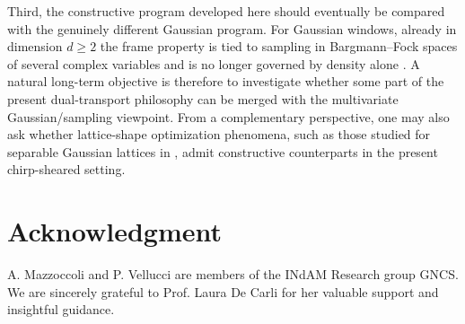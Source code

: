\documentclass[final,1p,times,authoryear]{elsarticle}
\theoremstyle{definition}
\newcommand{\1}{\mathbf{1}}
\begin{document}
Third, the constructive program developed here should eventually be compared with the genuinely different Gaussian program. For Gaussian windows, already in dimension $d\geq 2$ the frame property is tied to sampling in Bargmann--Fock spaces of several complex variables and is no longer governed by density alone \citep{Gro11}. A natural long-term objective is therefore to investigate whether some part of the present dual-transport philosophy can be merged with the multivariate Gaussian/sampling viewpoint. From a complementary perspective, one may also ask whether lattice-shape optimization phenomena, such as those studied for separable Gaussian lattices in \citep{FS17}, admit constructive counterparts in the present chirp-sheared setting.


\section*{Acknowledgment}
A. Mazzoccoli and P. Vellucci are members of the INdAM Research group GNCS. We are sincerely grateful to Prof. Laura De Carli for her valuable support and insightful guidance.



\end{document}
